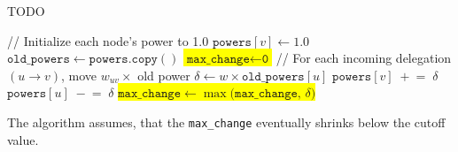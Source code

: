 \begin{algorithm} [h!]
 \caption{TODO}\label{alg:iterative_with_cutoff}
\begin{algorithmic}
\State // Initialize each node’s power to 1.0  
    \State \(\texttt{powers}[v] \gets 1.0\)
\EndFor
\Repeat
    \State \(\texttt{old\_powers} \gets \texttt{powers}.\texttt{copy}()\) 
    \State \colorbox{yellow}{\(\texttt{max\_change} \gets \texttt{0}\)} 
        \State // For each incoming delegation \((u \to v)\), move \(w_{uv}\times\) old power
            \State \(\delta \gets w \times \texttt{old\_powers}[u]\)
            \State \(\texttt{powers}[v] \;+\!=\; \delta\)
            \State \(\texttt{powers}[u] \;-\!=\; \delta\)
            \State \colorbox{yellow}{\(\texttt{max\_change} \gets \max\bigl(\texttt{max\_change},\,\delta\bigr)\)}
        \EndFor
    \EndFor
{}
\end{algorithmic}
\end{algorithm}

The algorithm assumes, that the \texttt{max\_change} eventually shrinks below the cutoff value. 

